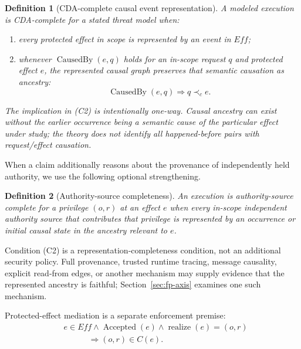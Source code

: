 \documentclass[10pt,twocolumn]{article}
\newcommand{\CausedBy}{\operatorname{CausedBy}}
\newcommand{\Realize}{\operatorname{realize}}
\newcommand{\Accepted}{\operatorname{Accepted}}
\newcommand{\hb}{\prec_{c}}
\newtheorem{definition}{Definition}
\begin{document}
\begin{definition}[CDA-complete causal event representation]
\label{def:event-complete}
A modeled execution is \emph{CDA-complete} for a stated threat model when:
\begin{enumerate}[label=(C\arabic*),leftmargin=*]
  \item every protected effect in scope is represented by an event in $Eff$;
  \item whenever $\CausedBy(e,q)$ holds for an in-scope request $q$ and
        protected effect $e$, the represented causal graph preserves that
        semantic causation as ancestry:
        \begin{equation}
          \CausedBy(e,q)\Longrightarrow q\hb e.
          \label{eq:causedby-ancestry}
        \end{equation}
\end{enumerate}
The implication in (C2) is intentionally one-way.  Causal ancestry can exist
without the earlier occurrence being a semantic cause of the particular effect
under study; the theory does not identify all happened-before pairs with
request/effect causation.
\end{definition}

When a claim additionally reasons about the provenance of independently held
authority, we use the following optional strengthening.
\begin{definition}[Authority-source completeness]
An execution is \emph{authority-source complete} for a privilege $(o,r)$ at an
effect $e$ when every in-scope independent authority source that contributes
that privilege is represented by an occurrence or initial causal state in the
ancestry relevant to $e$.
\end{definition}

Condition (C2) is a representation-completeness condition, not an additional
security policy.  Full provenance, trusted runtime tracing, message causality,
explicit read-from edges, or another mechanism may supply evidence that the
represented ancestry is faithful; Section~\ref{sec:fp-axis} examines one such
mechanism.

Protected-effect mediation is a separate enforcement premise:
\begin{equation}
\begin{aligned}
  &e\in Eff\land\Accepted(e)\land\Realize(e)=(o,r)\\
  &\hspace{3em}\Longrightarrow (o,r)\in C(e).
\end{aligned}
\label{eq:effect-admission}
\end{equation}
\end{document}
